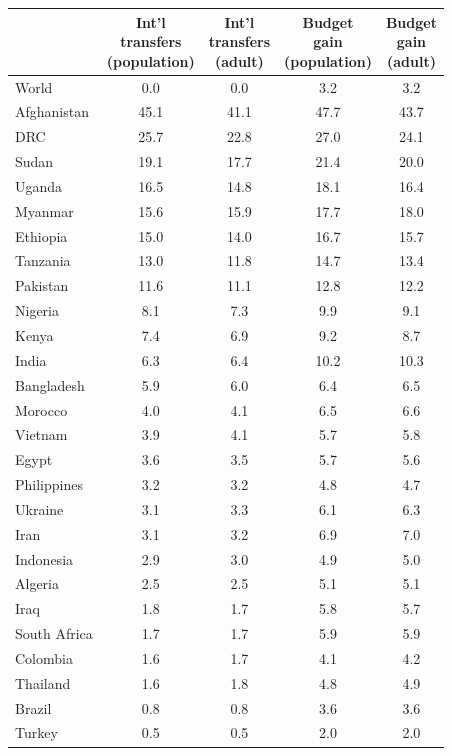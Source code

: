 
\begin{tabular}[t]{lcccc}
\toprule
  & \makecell{Int'l\\transfers\\(population)} & \makecell{Int'l\\transfers\\(adult)} & \makecell{Budget\\gain\\(population)} & \makecell{Budget\\gain\\(adult)}\\
\midrule
World & 0.0 & 0.0 & 3.2 & 3.2\\
Afghanistan & 45.1 & 41.1 & 47.7 & 43.7\\
DRC & 25.7 & 22.8 & 27.0 & 24.1\\
Sudan & 19.1 & 17.7 & 21.4 & 20.0\\
Uganda & 16.5 & 14.8 & 18.1 & 16.4\\
Myanmar & 15.6 & 15.9 & 17.7 & 18.0\\
Ethiopia & 15.0 & 14.0 & 16.7 & 15.7\\
Tanzania & 13.0 & 11.8 & 14.7 & 13.4\\
Pakistan & 11.6 & 11.1 & 12.8 & 12.2\\
Nigeria & 8.1 & 7.3 & 9.9 & 9.1\\
Kenya & 7.4 & 6.9 & 9.2 & 8.7\\
India & 6.3 & 6.4 & 10.2 & 10.3\\
Bangladesh & 5.9 & 6.0 & 6.4 & 6.5\\
Morocco & 4.0 & 4.1 & 6.5 & 6.6\\
Vietnam & 3.9 & 4.1 & 5.7 & 5.8\\
Egypt & 3.6 & 3.5 & 5.7 & 5.6\\
Philippines & 3.2 & 3.2 & 4.8 & 4.7\\
Ukraine & 3.1 & 3.3 & 6.1 & 6.3\\
Iran & 3.1 & 3.2 & 6.9 & 7.0\\
Indonesia & 2.9 & 3.0 & 4.9 & 5.0\\
Algeria & 2.5 & 2.5 & 5.1 & 5.1\\
Iraq & 1.8 & 1.7 & 5.8 & 5.7\\
South Africa & 1.7 & 1.7 & 5.9 & 5.9\\
Colombia & 1.6 & 1.7 & 4.1 & 4.2\\
Thailand & 1.6 & 1.8 & 4.8 & 4.9\\
Brazil & 0.8 & 0.8 & 3.6 & 3.6\\
Turkey & 0.5 & 0.5 & 2.0 & 2.0\\

\end{tabular}
